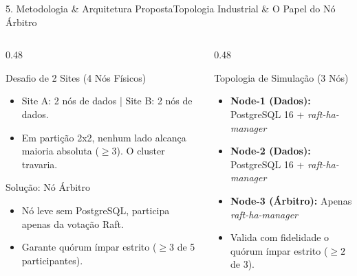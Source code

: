 \documentclass[aspectratio=169,10pt]{beamer}
\begin{document}
\begin{frame}{5. Metodologia \& Arquitetura Proposta}{Topologia Industrial \& O Papel do Nó Árbitro}
  \begin{columns}[t]
    \begin{column}{0.48\textwidth}
      \begin{alertblock}{Desafio de 2 Sites (4 Nós Físicos)}
        \begin{itemize}
          \item Site A: 2 nós de dados | Site B: 2 nós de dados.
          \item Em partição 2x2, nenhum lado alcança maioria absoluta ($\ge 3$). O cluster travaria.
        \end{itemize}
      \end{alertblock}
      \begin{exampleblock}{Solução: Nó Árbitro}
        \begin{itemize}
          \item Nó leve sem PostgreSQL, participa apenas da votação Raft.
          \item Garante quórum ímpar estrito ($\ge 3$ de 5 participantes).
        \end{itemize}
      \end{exampleblock}
    \end{column}
    \begin{column}{0.48\textwidth}
      \begin{block}{Topologia de Simulação (3 Nós)}
        \begin{itemize}
          \item \textbf{Node-1 (Dados):} PostgreSQL 16 + \textit{raft-ha-manager}
          \item \textbf{Node-2 (Dados):} PostgreSQL 16 + \textit{raft-ha-manager}
          \item \textbf{Node-3 (Árbitro):} Apenas \textit{raft-ha-manager}
          \item Valida com fidelidade o quórum ímpar estrito ($\ge 2$ de 3).
        \end{itemize}
      \end{block}
    \end{column}
  \end{columns}
\end{frame}
\end{document}
